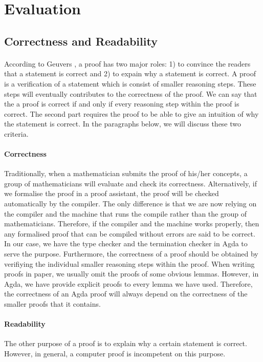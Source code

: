 \section{Evaluation}

\subsection{Correctness and Readability}
\paragraph{} According to Geuvers \cite{geuvers2009}, a proof has two major roles: 1)
to convince the readers that a statement is correct and 2) to expain
why a statement is correct. A proof is a verification of a statement
which is consist of smaller reasoning steps. These steps will eventually
contributes to the correctness of the proof. We can say that the a
proof is correct if and only if every reasoning step within the proof
is correct. The second part requires the proof to be able to give an
intuition of why the statement is correct. In the paragraphs below, we
will discuss these two criteria. 

\paragraph{Correctness} Traditionally, when a mathematician submits
the proof of his/her concepts, a group of mathematicians will
evaluate and check its correctness. Alternatively, if we
formalise the proof in a proof assistant, the proof will be checked
automatically by the compiler. The only difference is that we are now
relying on the compiler and the machine that runs the compile rather
than the group of mathematicians. Therefore, if the compiler and the
machine works properly, then any formalised proof that
can be compiled without errors are said to be correct. In our case, we
have the type checker and the termination checker in Agda to serve the
purpose. Furthermore, the correctness of a proof should be
obtained by verifiying the individual smaller reasoning steps within the
proof. When writing proofs in paper, we usually omit the proofs of
some obvious lemmas. However, in Agda, we have provide explicit proofs
to every lemma we have used. Therefore, the correctness of an Agda proof will always depend on the
correctness of the smaller proofs that it contains. 

\paragraph{Readability} The other purpose of a proof is to explain why
a certain statement is correct. However, in general, a computer proof
is incompetent on this purpose. 


